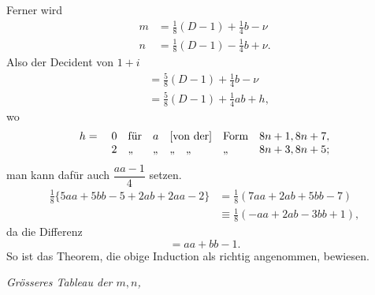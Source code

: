 \par\indent[7.] Ferner wird
\[
\begin{aligned}
m&=\tfrac18(D-1)+\tfrac14b-\nu\\
n&=\tfrac18(D-1)-\tfrac14b+\nu.
\end{aligned}
\]
\noindent Also der Decident von $1+i$
\[
\begin{aligned}
{}&=\tfrac58(D-1)+\tfrac14b-\nu\\
&=\tfrac58(D-1)+\tfrac14ab+h,
\end{aligned}
\]
\noindent wo
\[
\begin{array}{rclllll}
h={}&0&\text{für}&a&\text{[von der]}&\text{Form}&8n+1,8n+7,\\
&2&\text{„}&\text{„}&\text{„\quad „}&\text{„}&8n+3,8n+5;
\end{array}
\]
\noindent man kann dafür auch $\dfrac{aa-1}{4}$ setzen.
\[
\begin{aligned}
\tfrac18\{5aa+5bb-5+2ab+2aa-2\}&=\tfrac18(7aa+2ab+5bb-7)\\
&\equiv\tfrac18(-aa+2ab-3bb+1),
\end{aligned}
\]
\noindent da die Differenz
\[
{}=aa+bb-1.
\]
\noindent So ist das Theorem, die obige Induction als richtig angenommen, bewiesen.
\begin{center}\textit{Grösseres Tableau der $m,n$,}\end{center}
\begingroup\small\setlength{\tabcolsep}{5pt}\renewcommand{\arraystretch}{1.12}

